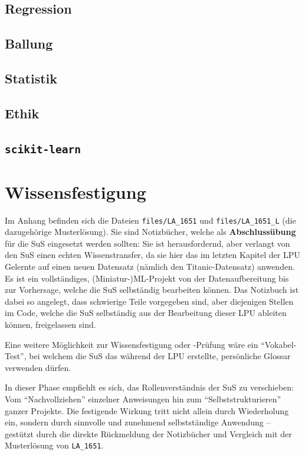 \documentclass[twocolumn]{article}
\begin{document}
\subsection{Regression}


\subsection{Ballung}


\subsection{Statistik}


\subsection{Ethik}


\subsection{\texttt{scikit-learn}}


\section{Wissensfestigung}
\label{sec:wissensfestigung}

Im Anhang befinden sich die Dateien \texttt{files/LA\_1651} und \texttt{files/LA\_1651\_L} (die dazugehörige Musterlösung). Sie sind Notizbücher, welche als \textbf{Abschlussübung} für die SuS eingesetzt werden sollten: Sie ist herausfordernd, aber verlangt von den SuS einen echten Wissenstransfer, da sie hier das im letzten Kapitel der LPU Gelernte auf einen neuen Datensatz (nämlich den Titanic-Datensatz) anwenden. Es ist ein vollständiges, (Miniatur-)ML-Projekt von der Datenaufbereitung bis zur Vorhersage, welche die SuS selbständig bearbeiten können. Das Notizbuch ist dabei so angelegt, dass schwierige Teile vorgegeben sind, aber diejenigen Stellen im Code, welche die SuS selbständig aus der Bearbeitung dieser LPU ableiten können, freigelassen sind. 


Eine weitere Möglichkeit zur Wissensfestigung oder -Prüfung wäre ein ``Vokabel-Test'', bei welchem die SuS das während der LPU erstellte, persönliche Glossar verwenden dürfen.

In dieser Phase empfiehlt es sich, das Rollenverständnis der SuS zu verschieben: Vom ``Nachvollziehen'' einzelner Anweisungen hin zum ``Selbststrukturieren'' ganzer Projekte. Die festigende Wirkung tritt nicht allein durch Wiederholung ein, sondern durch sinnvolle und zunehmend selbstständige Anwendung – gestützt durch die direkte Rückmeldung der Notizbücher und Vergleich mit der Musterlösung von \texttt{LA\_1651}.
\end{document}
